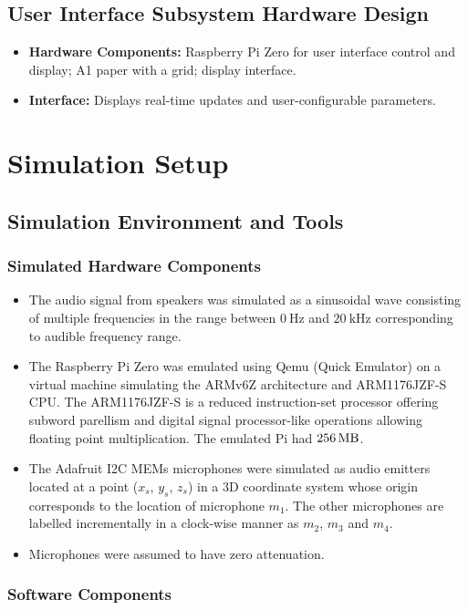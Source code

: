 \documentclass[a4paper,11pt]{article}
\newcommand{\mysection}[2]{\setcounter{section}{#1}\addtocounter{section}{-1}\section{#2}}
\begin{document}
\subsection{User Interface Subsystem Hardware Design}
\begin{itemize}
\item
\textbf{Hardware Components:} Raspberry Pi Zero for user interface control and display; A1 paper with a grid; display interface. 
\item
\textbf{Interface:} Displays real-time updates and user-configurable parameters. 
\end{itemize}

\mysection{4}{Simulation Setup}

\subsection{Simulation Environment and Tools}

\subsubsection{Simulated Hardware Components}

\begin{itemize}
	\item 
	The audio signal from speakers was simulated as a sinusoidal wave consisting of multiple frequencies in the range between $\SI{0}{\hertz}$ and $\SI{20}{\kilo\hertz}$ corresponding to audible frequency range. 
	\item
	The Raspberry Pi Zero was emulated using Qemu (Quick Emulator) on a virtual machine simulating the ARMv6Z architecture and ARM1176JZF-S CPU. The ARM1176JZF-S is a reduced instruction-set processor offering subword parellism and digital signal processor-like operations allowing floating point multiplication. The emulated Pi had $\SI{256}{\mega\byte}$.
	\item 
	The Adafruit I2C MEMs microphones were simulated as audio emitters located at a point ($x_s$, $y_s$, $z_s$) in a 3D coordinate system whose origin corresponds to the location of microphone $m_1$. The other microphones are labelled incrementally in a clock-wise manner as $m_2$, $m_3$ and $m_4$.
	\item 
	Microphones were assumed to have zero attenuation.
\end{itemize}

\subsubsection{Software Components}
\end{document}
